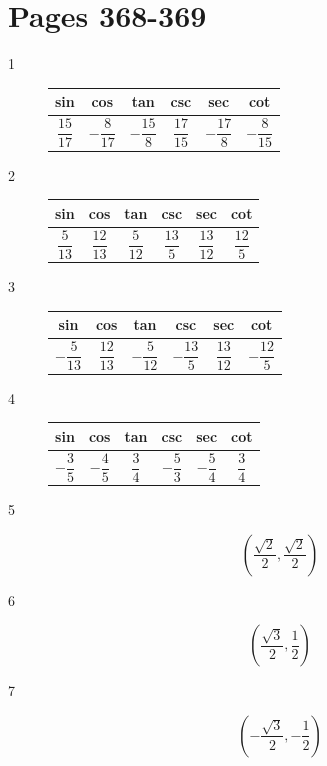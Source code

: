 \documentclass[fleqn,addpoints]{exam}
\begin{document}
\section{Pages 368-369}
\begin{description}
\item[1]

\begin{tabular}{cccccc}
\toprule
sin & cos & tan & csc & sec & cot \\
\midrule
  $\dfrac{15}{17}$ &  $-\dfrac{8}{17}$ & $-\dfrac{15}{8}$ & $\dfrac{17}{15}$ & $-\dfrac{17}{8}$ & $-\dfrac{8}{15}$ \\
\bottomrule
\end{tabular}

\item[2]
\begin{tabular}{cccccc}
\toprule
sin & cos & tan & csc & sec & cot \\
\midrule
  $\dfrac{5}{13}$ &  $\dfrac{12}{13}$ & $\dfrac{5}{12}$ & $\dfrac{13}{5}$ & $\dfrac{13}{12}$ & $\dfrac{12}{5}$ \\
\bottomrule
\end{tabular}

\item[3]
\begin{tabular}{cccccc}
\toprule
sin & cos & tan & csc & sec & cot \\
\midrule
  $-\dfrac{5}{13}$ &  $\dfrac{12}{13}$ & $-\dfrac{5}{12}$ & $-\dfrac{13}{5}$ & $\dfrac{13}{12}$ & $-\dfrac{12}{5}$ \\
\bottomrule
\end{tabular}

\item[4]
\begin{tabular}{cccccc}
\toprule
sin & cos & tan & csc & sec & cot \\
\midrule
  $-\dfrac{3}{5}$ &  $-\dfrac{4}{5}$ & $\dfrac{3}{4}$ & $-\dfrac{5}{3}$ & $-\dfrac{5}{4}$ & $\dfrac{3}{4}$ \\
\bottomrule
\end{tabular}

\item[5]
\[
  \left( \frac{\sqrt{2}}{2}, \frac{\sqrt{2}}{2} \right)
\]

\item[6]
\[
  \left( \frac{\sqrt{3}}{2}, \frac{1}{2} \right)
\]

\item[7]
\[
  \left(-\frac{\sqrt{3}}{2}, -\frac{1}{2} \right)
\]


\end{description}
\end{document}
